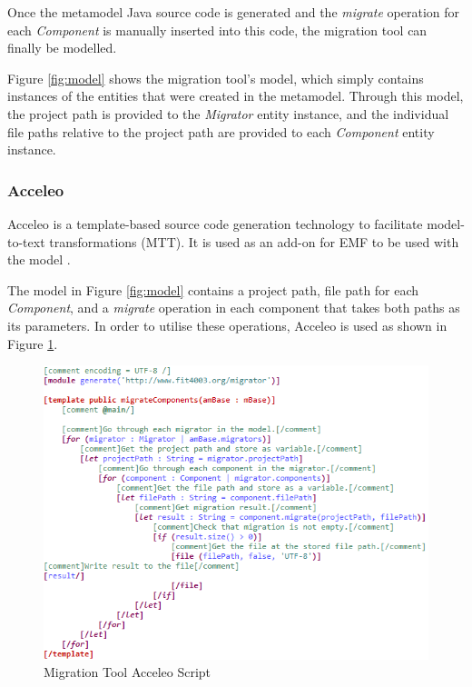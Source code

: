 \documentclass[conference]{IEEEtran}
\begin{document}
Once the metamodel Java source code is generated and the \textit{migrate} operation for each \textit{Component} is manually inserted into this code, the migration tool can finally be modelled.

Figure \ref{fig:model} shows the migration tool’s model, which simply contains instances of the entities that were created in the metamodel. Through this model, the project path is provided to the \textit{Migrator} entity instance, and the individual file paths relative to the project path are provided to each \textit{Component} entity instance.

\subsubsection*{Acceleo}

Acceleo is a template-based source code generation technology to facilitate model-to-text transformations (MTT). It is used as an add-on for EMF to be used with the model \cite{b13}.

The model in Figure \ref{fig:model} contains a project path, file path for each \textit{Component}, and a \textit{migrate} operation in each component that takes both paths as its parameters. In order to utilise these operations, Acceleo is used as shown in Figure \ref{fig:acceleo}.

\begin{figure}[htbp]
\centerline{\includegraphics[width=\linewidth,keepaspectratio]{acceleo.png}}
\caption{Migration Tool Acceleo Script}
\label{fig:acceleo}
\end{figure}
\end{document}
